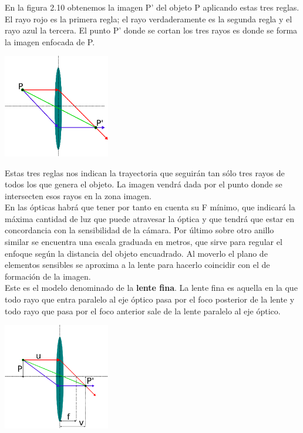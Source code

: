 En la figura 2.10 obtenemos la imagen P' del objeto P aplicando estas tres reglas. El rayo rojo es la primera regla;
el rayo verdaderamente es la segunda regla y el rayo azul la tercera. El punto P' donde se cortan los tres rayos es donde se forma la
imagen enfocada de P.
\begin{center}
	\includegraphics[width=0.35\textwidth]{Contenido/Cuerpo/Capitulo2/Fig1_10.eps}
	\label{fig:MarcoTeorico:Fig10}
\end{center}
Estas tres reglas nos indican la trayectoria que seguirán tan sólo tres rayos de todos los que genera el objeto. La imagen vendrá
dada por el punto donde se intersecten esos rayos en la zona imagen.\\
En las ópticas habrá que tener por
tanto en cuenta su F mínimo, que indicará la máxima cantidad de luz que puede
atravesar la óptica y que tendrá que estar en concordancia con la sensibilidad de la
cámara. Por último sobre otro anillo similar se encuentra una escala graduada en metros,
que sirve para regular el enfoque según la distancia del objeto encuadrado. Al moverlo
el plano de elementos sensibles se aproxima a la lente para hacerlo coincidir con el de
formación de la imagen.\\
Este es el modelo denominado de la \textbf{lente fina}. La
lente fina es aquella en la que todo rayo que entra paralelo al eje óptico pasa por el foco
posterior de la lente y todo rayo que pasa por el foco anterior sale de la lente paralelo al
eje óptico.
\begin{center}
	\includegraphics[width=0.35\textwidth]{Contenido/Cuerpo/Capitulo2/Fig1_11.eps}
	\label{fig:MarcoTeorico:Fig11}
\end{center}

